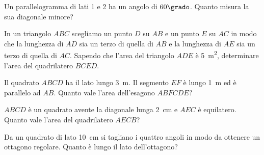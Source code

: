 \begin{multicols}{2}
\begin{esercizio}
\label{ese:7.101}
Un parallelogramma di lati 1 e 2 ha un angolo di $60\grado$. Quanto 
misura la sua diagonale minore?   
\end{esercizio}

\begin{esercizio}
\label{ese:7.102}
In un triangolo $ABC$ scegliamo un punto $D$ su $AB$ e un punto $E$ 
su $AC$ in modo che la lunghezza di $AD$ sia un terzo di quella di 
$AB$ e la lunghezza di $AE$ sia un terzo di quella di $AC$. Sapendo 
che l'area del triangolo $ADE$ è 5~m\textsuperscript{2}, determinare 
l'area del quadrilatero $BCED$.
\end{esercizio}

\begin{esercizio}
\label{ese:7.103}
Il quadrato $ABCD$ ha il lato lungo 3~m. Il segmento $EF$ è lungo 1~m 
ed è parallelo ad $AB$. Quanto vale l'area dell'esagono $ABFCDE$?
\end{esercizio}

%

\begin{esercizio}
\label{ese:7.104}
$ABCD$ è un quadrato avente la diagonale lunga 2~cm e $AEC$ è 
equilatero. Quanto vale l'area del quadrilatero $AECB$?
\end{esercizio}

%

\begin{esercizio}
\label{ese:7.105}
Da un quadrato di lato 10~cm si tagliano i quattro angoli in modo da 
ottenere un ottagono regolare. Quanto è lungo il lato dell'ottagono?
\end{esercizio}


\end{multicols}
